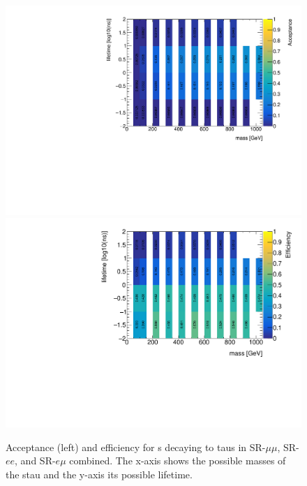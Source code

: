 \begin{figure}[htbp]
\centering
\includegraphics[width=.48\textwidth]{figures/event_selection/mm_slep_acc.pdf}
\includegraphics[width=.48\textwidth]{figures/event_selection/mm_slep_eff.pdf}
\caption{Acceptance (left) and efficiency for \stau s decaying to taus in SR-$\mu\mu$, SR-$ee$, and SR-$e\mu$ combined. The x-axis shows the possible masses of the stau and the y-axis its possible lifetime.}
\label{fig:acc-eff-em}
\end{figure}




